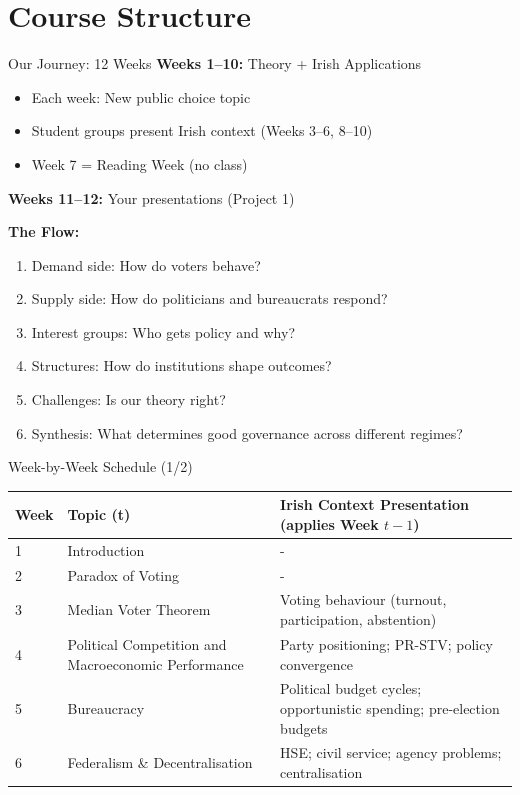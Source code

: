 \documentclass[10pt]{beamer}
\begin{document}
\section{Course Structure}

\begin{frame}{Our Journey: 12 Weeks}
\textbf{Weeks 1--10:} Theory + Irish Applications
\begin{itemize}
\item Each week: New public choice topic
\item Student groups present Irish context (Weeks 3--6, 8--10)
\item Week 7 = Reading Week (no class)
\end{itemize}

\textbf{Weeks 11--12:} Your presentations (Project 1)

\vspace{0.5cm}
\pause
\textbf{The Flow:}
\begin{enumerate}
\item Demand side: How do voters behave?
\item Supply side: How do politicians and bureaucrats respond?
\item Interest groups: Who gets policy and why?
\item Structures: How do institutions shape outcomes?
\item Challenges: Is our theory right?
\item Synthesis: What determines good governance across different regimes?
\end{enumerate}
\end{frame}


\begin{frame}{Week-by-Week Schedule (1/2)}
\small
\begin{tabular}{p{0.9cm} p{3.1cm} p{5.8cm}}
\toprule
\textbf{Week} & \textbf{Topic (t)} & \textbf{Irish Context Presentation (applies Week $t-1$)} \\
\midrule
1 & Introduction & - \\
2 & Paradox of Voting & - \\
3 & Median Voter Theorem & Voting behaviour (turnout, participation, abstention) \\
4 & Political Competition and Macroeconomic Performance & Party positioning; PR-STV; policy convergence \\
5 & Bureaucracy & Political budget cycles; opportunistic spending; pre-election budgets \\
6 & Federalism \& Decentralisation & HSE; civil service; agency problems; centralisation \\
\bottomrule
\end{tabular}
\end{frame}
\end{document}
